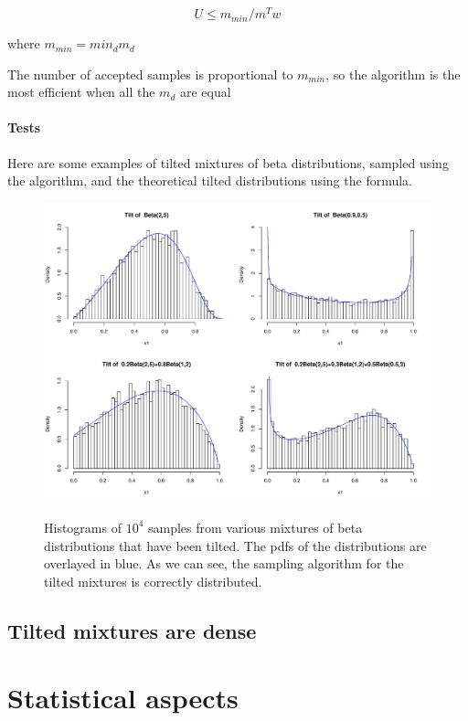 \documentclass[10pt]{report}
\begin{document}
$$
U\leq m_{min}/m^Tw
$$

where $m_{min} = min_d m_d$

The number of accepted samples is proportional to $m_{min}$, so the algorithm is the most efficient when all the $m_d$ are equal

\subsubsection{Tests}
Here are some examples of tilted mixtures of beta distributions, sampled using the algorithm, and the theoretical tilted distributions using the formula.

\begin{figure}[h]
\centering
\includegraphics[width=\textwidth]{histogram_tilt.pdf}
\label{fig:historam_tilt}
\caption{Histograms of $10^4$ samples from various mixtures of beta distributions that have been tilted. The pdfs of the distributions are overlayed in blue. As we can see, the sampling algorithm for the tilted mixtures is correctly distributed.}
\end{figure}




\section{Tilted mixtures are dense}

\chapter{Statistical aspects}
\label{sec:stats}
\end{document}
